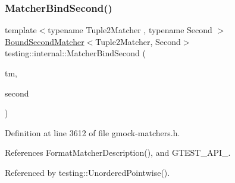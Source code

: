 \subsubsection{\texorpdfstring{Matcher\+Bind\+Second()}{MatcherBindSecond()}}
{\footnotesize\ttfamily template$<$typename Tuple2\+Matcher , typename Second $>$ \\
\hyperlink{classtesting_1_1internal_1_1BoundSecondMatcher}{Bound\+Second\+Matcher}$<$Tuple2\+Matcher, Second$>$ testing\+::internal\+::\+Matcher\+Bind\+Second (\begin{DoxyParamCaption}\item[{const Tuple2\+Matcher \&}]{tm,  }\item[{const Second \&}]{second }\end{DoxyParamCaption})}



Definition at line 3612 of file gmock-\/matchers.\+h.



References Format\+Matcher\+Description(), and G\+T\+E\+S\+T\+\_\+\+A\+P\+I\+\_\+.



Referenced by testing\+::\+Unordered\+Pointwise().


